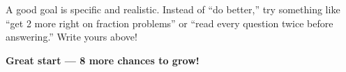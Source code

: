 {\begin{tcolorbox}[
    enhanced,
    colback=funGreenLight,
    colframe=funGreen!50,
    arc=10pt,
    boxrule=1pt,
    left=6mm, right=6mm, top=4mm, bottom=4mm,
]
\vspace{2mm}

A good goal is specific and realistic. Instead of ``do better,'' try something like ``get 2 more right on fraction problems'' or ``read every question twice before answering.'' Write yours above!
\end{tcolorbox}

\vspace{4mm}

\begin{center}
{\large\bfseries\color{funBlueDark} \faThumbsUp\hspace{2mm}Great start — 8 more chances to grow!\hspace{2mm}\faThumbsUp}
\end{center}

}
\newpage
